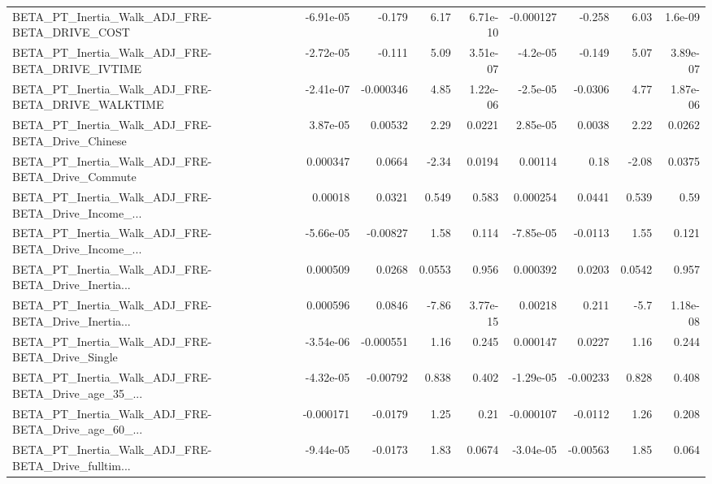 \begin{tabular}{lrrrrrrrr}
BETA\_PT\_Inertia\_Walk\_ADJ\_FRE-BETA\_DRIVE\_COST       &   -6.91e-05 &       -0.179 &     6.17 & 6.71e-10 &  -0.000127 &      -0.258 &         6.03 &       1.6e-09 \\
BETA\_PT\_Inertia\_Walk\_ADJ\_FRE-BETA\_DRIVE\_IVTIME     &   -2.72e-05 &       -0.111 &     5.09 & 3.51e-07 &   -4.2e-05 &      -0.149 &         5.07 &      3.89e-07 \\
BETA\_PT\_Inertia\_Walk\_ADJ\_FRE-BETA\_DRIVE\_WALKTIME   &   -2.41e-07 &    -0.000346 &     4.85 & 1.22e-06 &   -2.5e-05 &     -0.0306 &         4.77 &      1.87e-06 \\
BETA\_PT\_Inertia\_Walk\_ADJ\_FRE-BETA\_Drive\_Chinese    &    3.87e-05 &      0.00532 &     2.29 &   0.0221 &   2.85e-05 &      0.0038 &         2.22 &        0.0262 \\
BETA\_PT\_Inertia\_Walk\_ADJ\_FRE-BETA\_Drive\_Commute    &    0.000347 &       0.0664 &    -2.34 &   0.0194 &    0.00114 &        0.18 &        -2.08 &        0.0375 \\
BETA\_PT\_Inertia\_Walk\_ADJ\_FRE-BETA\_Drive\_Income\_... &     0.00018 &       0.0321 &    0.549 &    0.583 &   0.000254 &      0.0441 &        0.539 &          0.59 \\
BETA\_PT\_Inertia\_Walk\_ADJ\_FRE-BETA\_Drive\_Income\_... &   -5.66e-05 &     -0.00827 &     1.58 &    0.114 &  -7.85e-05 &     -0.0113 &         1.55 &         0.121 \\
BETA\_PT\_Inertia\_Walk\_ADJ\_FRE-BETA\_Drive\_Inertia... &    0.000509 &       0.0268 &   0.0553 &    0.956 &   0.000392 &      0.0203 &       0.0542 &         0.957 \\
BETA\_PT\_Inertia\_Walk\_ADJ\_FRE-BETA\_Drive\_Inertia... &    0.000596 &       0.0846 &    -7.86 & 3.77e-15 &    0.00218 &       0.211 &         -5.7 &      1.18e-08 \\
BETA\_PT\_Inertia\_Walk\_ADJ\_FRE-BETA\_Drive\_Single     &   -3.54e-06 &    -0.000551 &     1.16 &    0.245 &   0.000147 &      0.0227 &         1.16 &         0.244 \\
BETA\_PT\_Inertia\_Walk\_ADJ\_FRE-BETA\_Drive\_age\_35\_... &   -4.32e-05 &     -0.00792 &    0.838 &    0.402 &  -1.29e-05 &    -0.00233 &        0.828 &         0.408 \\
BETA\_PT\_Inertia\_Walk\_ADJ\_FRE-BETA\_Drive\_age\_60\_... &   -0.000171 &      -0.0179 &     1.25 &     0.21 &  -0.000107 &     -0.0112 &         1.26 &         0.208 \\
BETA\_PT\_Inertia\_Walk\_ADJ\_FRE-BETA\_Drive\_fulltim... &   -9.44e-05 &      -0.0173 &     1.83 &   0.0674 &  -3.04e-05 &    -0.00563 &         1.85 &         0.064 \\

\end{tabular}
